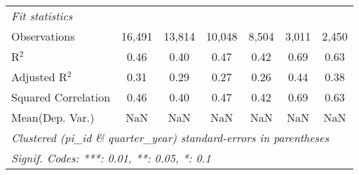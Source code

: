\begin{tabular}{lcccccc}
   \midrule
   \emph{Fit statistics}\\
   Observations                                               & 16,491         & 13,814         & 10,048        & 8,504        & 3,011   & 2,450\\  
   R$^2$                                                      & 0.46           & 0.40           & 0.47          & 0.42         & 0.69    & 0.63\\  
   Adjusted R$^2$                                             & 0.31           & 0.29           & 0.27          & 0.26         & 0.44    & 0.38\\  
   Squared Correlation                                        & 0.46           & 0.40           & 0.47          & 0.42         & 0.69    & 0.63\\  
Mean(Dep. Var.) & NaN & NaN & NaN & NaN & NaN & NaN \\
   \midrule \midrule
   \multicolumn{7}{l}{\emph{Clustered (pi\_id \& quarter\_year) standard-errors in parentheses}}\\
   \multicolumn{7}{l}{\emph{Signif. Codes: ***: 0.01, **: 0.05, *: 0.1}}\\
\end{tabular}
\par\endgroup
